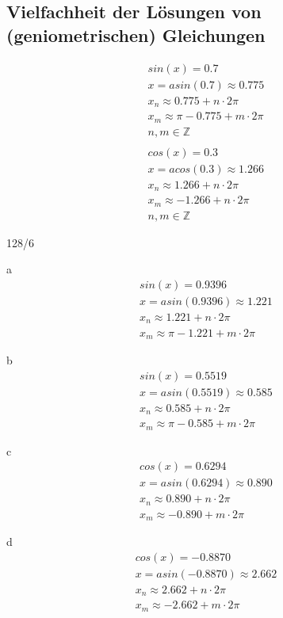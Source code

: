 \subsection{Vielfachheit der Lösungen von (geniometrischen) Gleichungen}
\begin{gather*}
  sin(x) = 0.7 \\
  x = asin(0.7) \approx 0.775 \\
  x_n \approx 0.775 + n \cdot 2\pi \\
  x_m \approx \pi - 0.775 + m \cdot 2\pi \\
  n, m \in \mathbb{Z} \\\\
  cos(x) = 0.3 \\
  x = acos(0.3) \approx 1.266 \\
  x_n \approx 1.266 + n \cdot 2\pi \\
  x_m \approx -1.266 + n \cdot 2\pi \\
  n, m \in \mathbb{Z}
\end{gather*}
\begin{exercise}{128/6}
  \item [a]
  \begin{gather*}
    sin(x) = 0.9396 \\
    x = asin(0.9396) \approx 1.221 \\
    x_n \approx 1.221 + n \cdot 2\pi \\
    x_m \approx \pi - 1.221 + m \cdot 2\pi
  \end{gather*}
  \item [b]
  \begin{gather*}
    sin(x) = 0.5519 \\
    x = asin(0.5519) \approx 0.585 \\
    x_n \approx 0.585 + n \cdot 2\pi \\
    x_m \approx \pi - 0.585 + m \cdot 2\pi
  \end{gather*}
  \item [c]
  \begin{gather*}
    cos(x) = 0.6294 \\
    x = asin(0.6294) \approx 0.890 \\
    x_n \approx 0.890 + n \cdot 2\pi \\
    x_m \approx -0.890 + m \cdot 2\pi
  \end{gather*}
  \item [d]
  \begin{gather*}
    cos(x) = -0.8870 \\
    x = asin(-0.8870) \approx 2.662 \\
    x_n \approx 2.662 + n \cdot 2\pi \\
    x_m \approx -2.662 + m \cdot 2\pi
  \end{gather*}
\end{exercise}
